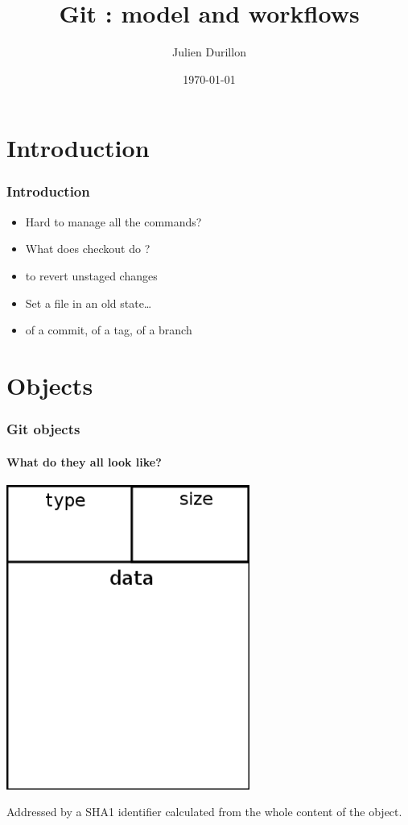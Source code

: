 \documentclass{beamer}
\title{Git : model and workflows}
\author{Julien Durillon}
\institute{Clever Cloud}
\date{\today}
\begin{document}
	\frame{\titlepage}


	\section{Introduction}
	\begin{frame}
	    \frametitle{Introduction}
	    \begin{itemize}
            \item Hard to manage all the commands?
            \item What does checkout do ? \pause
            \item to revert unstaged changes\pause
            \item Set a file in an old state\dots \pause
            \item of a commit, of a tag, of a branch
	    \end{itemize}
	\end{frame}


	\section{Objects}

	\begin{frame}
        \frametitle{Git objects}
        \framesubtitle{What do they all look like?}
        \begin{minipage}{0.5\textwidth}
        \begin{center}
            \includegraphics[width=0.6\textwidth]{./figures/object.png}
        \end{center}
        \end{minipage}
        \begin{minipage}{0.4\textwidth}
        Addressed by a SHA1 identifier calculated from the whole content of the object.
        \end{minipage}
	\end{frame}
\end{document}
